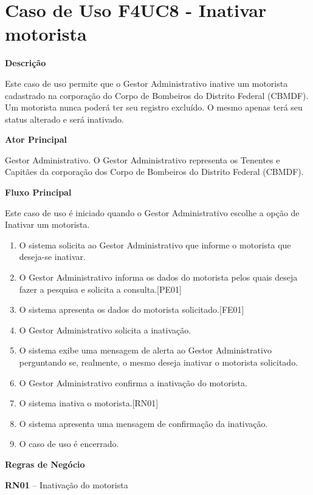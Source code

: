 
  \section{Caso de Uso F4UC8 - Inativar motorista}

  {\raggedright
      \textbf{Descrição}
  }

    Este caso de uso permite que o Gestor Administrativo inative  um motorista cadastrado na corporação do Corpo de Bombeiros do
    Distrito Federal (CBMDF). Um motorista nunca poderá ter seu registro excluído. O mesmo apenas terá seu status alterado e será
    inativado.
    
  {\raggedright
      \textbf{Ator Principal}
  }

    Gestor Administrativo. O Gestor Administrativo representa os Tenentes e Capitães da corporação dos Corpo de Bombeiros do
    Distrito Federal (CBMDF).


  {\raggedright
      \textbf{Fluxo Principal}
  }
  
    Este caso de uso é iniciado quando o Gestor Administrativo escolhe a opção de Inativar um motorista.
  
  \begin{enumerate}
    \item O sistema solicita ao Gestor Administrativo que informe o motorista que deseja-se inativar.
    \item O Gestor Administrativo  informa os dados do motorista pelos quais deseja fazer a pesquisa e solicita a consulta.[PE01]
    \item O sistema apresenta os dados do motorista solicitado.[FE01]
    \item O Gestor Administrativo solicita a inativação.
    \item O sistema exibe uma mensagem de alerta ao Gestor Administrativo perguntando se, realmente, o mesmo deseja inativar o
    motorista solicitado.
    \item O Gestor Administrativo confirma a inativação do motorista.
    \item O sistema inativa o motorista.[RN01]
    \item O sistema apresenta uma mensagem de confirmação da inativação.
    \item O caso de uso é encerrado.

  \end{enumerate}
  
  
   {\raggedright
      \textbf{Regras de Negócio}
   }
   
   \textbf{RN01} – Inativação do motorista
   

